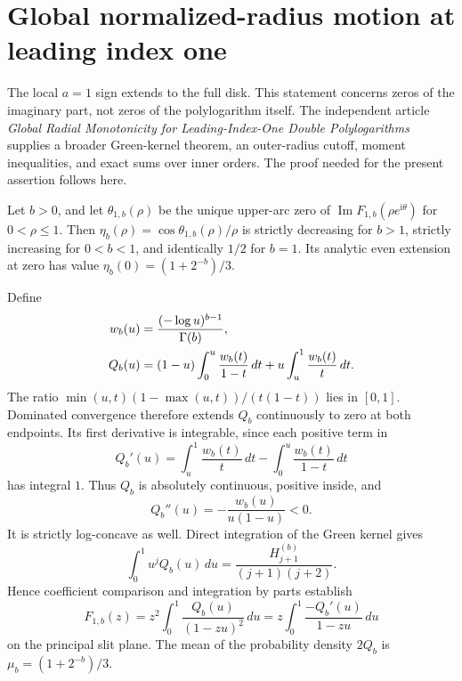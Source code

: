 \section{Global normalized-radius motion at leading index one}
\label{lone:sec:global-radius}

The local $a=1$ sign extends to the full disk. This statement concerns
zeros of the imaginary part, not zeros of the polylogarithm itself.
The independent article \emph{Global Radial Monotonicity for
Leading-Index-One Double Polylogarithms} supplies a broader Green-kernel
theorem, an outer-radius cutoff, moment inequalities, and exact sums over
inner orders. The proof needed for the present assertion follows here.

\begin{theorem}
\label{lone:thm:global-radius}
Let $b>0$, and let $\theta_{1,b}(\rho)$ be the unique upper-arc zero of
$\operatorname{Im}F_{1,b}(\rho e^{\mathrm i\theta})$ for $0<\rho\le1$.
Then $\eta_b(\rho)=\cos\theta_{1,b}(\rho)/\rho$ is strictly decreasing
for $b>1$, strictly increasing for $0<b<1$, and identically $1/2$ for
$b=1$. Its analytic even extension at zero has value
$\eta_b(0)=(1+2^{-b})/3$.
\end{theorem}

Define
\begin{align}
 w_b(u)&=\frac{(-\log u)^{b-1}}{\Gamma(b)},\notag\\
 Q_b(u)&=(1-u)\int_0^u\frac{w_b(t)}{1-t}\,dt
             +u\int_u^1\frac{w_b(t)}t\,dt.
 \label{lone:eq:green}
\end{align}
The ratio $\min(u,t)(1-\max(u,t))/(t(1-t))$ lies in $[0,1]$.
Dominated convergence therefore extends $Q_b$ continuously to zero at
both endpoints. Its first derivative is integrable, since each positive
term in
\[
 Q_b'(u)=\int_u^1\frac{w_b(t)}t\,dt
                 -\int_0^u\frac{w_b(t)}{1-t}\,dt
\]
has integral $1$. Thus $Q_b$ is absolutely continuous, positive inside,
and
\begin{equation}\label{lone:eq:curvature}
 Q_b''(u)=-\frac{w_b(u)}{u(1-u)}<0.
\end{equation}
It is strictly log-concave as well. Direct integration of the Green
kernel gives
\[
 \int_0^1u^jQ_b(u)\,du
       =\frac{H_{j+1}^{(b)}}{(j+1)(j+2)}.
\]
Hence coefficient comparison and integration by parts establish
\begin{equation}\label{lone:eq:stieltjes}
 F_{1,b}(z)=z^2\int_0^1\frac{Q_b(u)}{(1-zu)^2}\,du
           =z\int_0^1\frac{-Q_b'(u)}{1-zu}\,du
\end{equation}
on the principal slit plane. The mean of the probability density $2Q_b$
is $\mu_b=(1+2^{-b})/3$.

